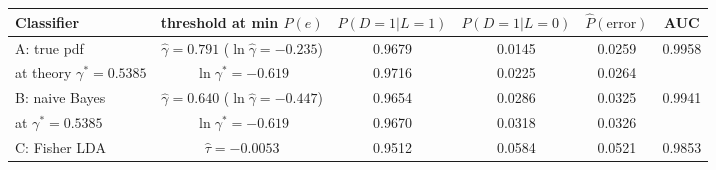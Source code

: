 \begin{tabular}{lccccc}
\toprule
Classifier & threshold at min $P(e)$ & $P(D{=}1|L{=}1)$ & $P(D{=}1|L{=}0)$ & $\hat P(\text{error})$ & AUC \\
\midrule
A: true pdf & $\hat\gamma = 0.791$ ($\ln\hat\gamma=-0.235$) & 0.9679 & 0.0145 & 0.0259 & 0.9958 \\
\quad at theory $\gamma^*=0.5385$ & $\ln\gamma^*=-0.619$ & 0.9716 & 0.0225 & 0.0264 & \\
B: naive Bayes & $\hat\gamma = 0.640$ ($\ln\hat\gamma=-0.447$) & 0.9654 & 0.0286 & 0.0325 & 0.9941 \\
\quad at $\gamma^*=0.5385$ & $\ln\gamma^*=-0.619$ & 0.9670 & 0.0318 & 0.0326 & \\
C: Fisher LDA & $\hat\tau = -0.0053$ & 0.9512 & 0.0584 & 0.0521 & 0.9853 \\
\bottomrule
\end{tabular}
